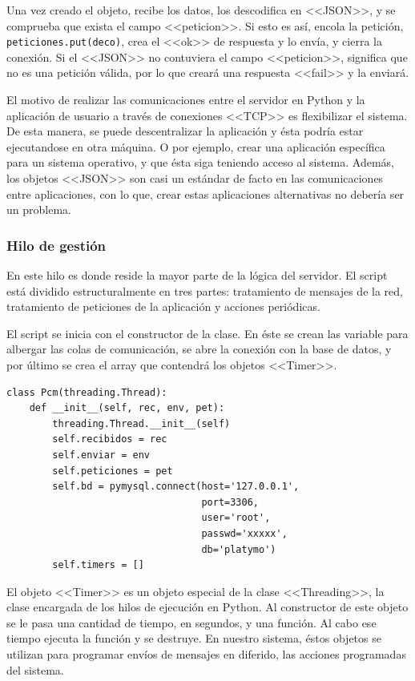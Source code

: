 Una vez creado el objeto, recibe los datos, los descodifica en  <<JSON>>, y se comprueba que exista el campo <<peticion>>. Si esto es así, encola la petición, \lstinline|peticiones.put(deco)|, crea el <<ok>> de respuesta y lo envía, y cierra la conexión. Si el <<JSON>> no contuviera el campo <<peticion>>, significa que no es una petición válida, por lo que creará una respuesta <<fail>> y la enviará. 

El motivo de realizar las comunicaciones entre el servidor en Python y la aplicación de usuario a través de conexiones <<TCP>> es flexibilizar el sistema. De esta manera, se puede descentralizar la aplicación y ésta podría estar ejecutandose en otra máquina. O por ejemplo, crear una aplicación específica para un sistema operativo, y que ésta siga teniendo acceso al sistema. Además, los objetos <<JSON>> son casi un estándar de facto en las comunicaciones entre aplicaciones, con lo que, crear estas aplicaciones alternativas no debería ser un problema.


\subsubsection{Hilo de gestión}

En este hilo es donde reside la mayor parte de la lógica del servidor. El script está dividido estructuralmente en tres partes: tratamiento de mensajes de la red, tratamiento de peticiones de la aplicación y acciones periódicas.

El script se inicia con el constructor de la clase. En éste se crean las variable para albergar las colas de comunicación, se abre la conexión con la base de datos, y por último se crea el array que contendrá los objetos <<Timer>>.

\begin{lstlisting}
class Pcm(threading.Thread):
    def __init__(self, rec, env, pet):
        threading.Thread.__init__(self)
        self.recibidos = rec
        self.enviar = env
        self.peticiones = pet
        self.bd = pymysql.connect(host='127.0.0.1', 
                                  port=3306,
                                  user='root', 
                                  passwd='xxxxx', 
                                  db='platymo')
        self.timers = []
\end{lstlisting}

El objeto <<Timer>> es un objeto especial de la clase <<Threading>>, la clase encargada de los hilos de ejecución en Python. Al constructor de este objeto se le pasa una cantidad de tiempo, en segundos, y una función. Al cabo ese tiempo ejecuta la función y se destruye. En nuestro sistema, éstos objetos se utilizan para programar envíos de mensajes en diferido, las acciones programadas del sistema. 

